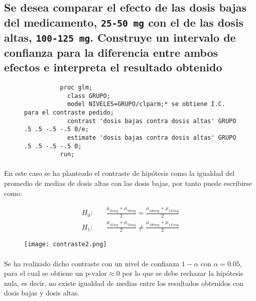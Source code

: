 \documentclass{article}
\begin{document}
    \subsection{Se desea comparar el efecto de las dosis bajas del medicamento, \texttt{25-50 mg} con el de las dosis altas, \texttt{100-125 mg}. Construye un intervalo de confianza para la diferencia entre ambos efectos e interpreta el resultado obtenido}

      \begin{figure}[h]
        \centering
        \begin{verbatim}
          proc glm;
            class GRUPO;
            model NIVELES=GRUPO/clparm;* se obtiene I.C. para el contraste pedido;
            contrast 'dosis bajas contra dosis altas' GRUPO .5 .5 -.5 -.5 0/e;
            estimate 'dosis bajas contra dosis altas' GRUPO .5 .5 -.5 -.5 0;
          run;
        \end{verbatim}
        \label{code:sas_7}
      \end{figure}

      \paragraph{}
      En este caso se ha planteado el contraste de hipótesis como la igualdad del promedio de medias de dosis altas con las dosis bajas, por tanto puede escribirse como:

      \begin{align*}
        H_0:& \quad \frac{\mu_{25mg} + \mu_{50mg}}{2} = \frac{\mu_{100mg} +\mu_{125mg}}{2} \\
        H_1:& \quad \frac{\mu_{25mg} + \mu_{50mg}}{2} \neq \frac{\mu_{100mg} +\mu_{125mg}}{2}
      \end{align*}

      \begin{figure}[H]
        \centering
        \texttt{[image: contraste2.png]}
      \end{figure}

      \paragraph{}
      Se ha realizado dicho contraste con un nivel de confianza $1-\alpha$ con $\alpha = 0.05 $, para el cual se obtiene un $\text{p-valor}\approx 0$ por lo que se debe rechazar la hipótesis nula, es decir, no existe igualdad de medias entre los resultados obtenidos con dosis bajas y dosis altas.
\end{document}

